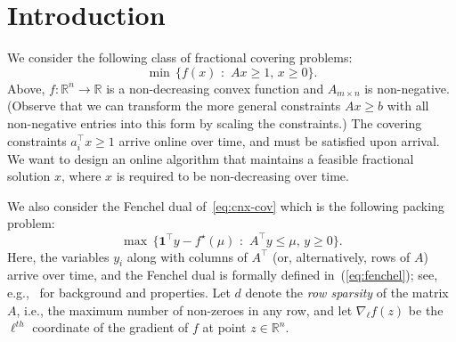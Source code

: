 \documentclass[letterpaper,11pt]{article}
\def \RR   {{\mathbb R}}
\newcommand{\trans}{\intercal}
\begin{document}
\newpage


\section{Introduction}

We consider the following class of fractional covering problems:
\begin{equation}\label{eq:cnx-cov}
  \min\,\{ f(x)\,\, :\,\, Ax\ge 1,\, x\ge 0\}.
\end{equation}
Above, $f:\RR^n\rightarrow \RR$ is a non-decreasing convex function and
$A_{m\times n}$ is non-negative. (Observe that we can transform the more
general constraints $Ax \geq b$ with all non-negative entries into this
form by scaling the constraints.) The covering constraints $a_i^\trans
x\ge 1$ arrive online over time, and must be satisfied upon arrival. We
want to design an online algorithm that maintains a feasible fractional
solution $x$, where $x$ is required to be non-decreasing over time.

We also consider the Fenchel dual of~\eqref{eq:cnx-cov} which is the
following packing problem:
\begin{equation}\label{eq:cnx-pack}
  \max\,\{ \mathbf{1}^\trans y - f^\star(\mu)\,\, :\,\, A^\trans  y \le
  \mu,\, y\ge 0\}.
\end{equation}
Here, the variables $y_i$ along with columns of $A^\trans$ (or,
alternatively, rows of $A$) arrive over time, and the Fenchel dual is
formally defined in~(\ref{eq:fenchel}); see, e.g.,~\cite{Rock} for
background and properties.
Let $d$ denote the {\em row sparsity} of the matrix $A$, i.e., the maximum number of non-zeroes in any row, and let $\nabla_\ell f(z)$ be the $\ell^{th}$ coordinate of the gradient of $f$ at point $z \in \RR^n$.
\end{document}
